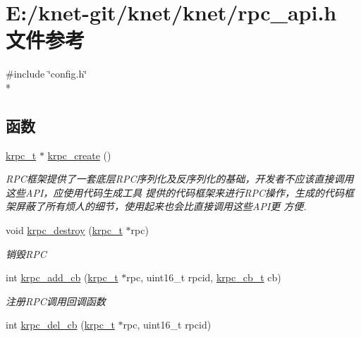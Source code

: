 \hypertarget{a00094}{}\section{E\+:/knet-\/git/knet/knet/rpc\+\_\+api.h 文件参考}
\label{a00094}
{\ttfamily \#include \char`\"{}config.\+h\char`\"{}}\\*
\subsection*{函数}
\begin{DoxyCompactItemize}
\item 
\hyperlink{a00056_a1e414ac6f6de24462ccf81e10f63428d_a1e414ac6f6de24462ccf81e10f63428d}{krpc\+\_\+t} $\ast$ \hyperlink{a00094_a5d55f838d222f44965d99eac9a0381c1_a5d55f838d222f44965d99eac9a0381c1}{krpc\+\_\+create} ()
\begin{DoxyCompactList}\small\item\em R\+P\+C框架提供了一套底层\+R\+P\+C序列化及反序列化的基础，开发者不应该直接调用这些\+A\+P\+I，应使用代码生成工具 提供的代码框架来进行\+R\+P\+C操作，生成的代码框架屏蔽了所有烦人的细节，使用起来也会比直接调用这些\+A\+P\+I更 方便. \end{DoxyCompactList}\item 
void \hyperlink{a00094_ab07c8ccf1abc99b85f455a2f4280ac76_ab07c8ccf1abc99b85f455a2f4280ac76}{krpc\+\_\+destroy} (\hyperlink{a00056_a1e414ac6f6de24462ccf81e10f63428d_a1e414ac6f6de24462ccf81e10f63428d}{krpc\+\_\+t} $\ast$rpc)
\begin{DoxyCompactList}\small\item\em 销毁\+R\+P\+C \end{DoxyCompactList}\item 
int \hyperlink{a00094_aa12a9874d2b0308994c3fa651cdbbd61_aa12a9874d2b0308994c3fa651cdbbd61}{krpc\+\_\+add\+\_\+cb} (\hyperlink{a00056_a1e414ac6f6de24462ccf81e10f63428d_a1e414ac6f6de24462ccf81e10f63428d}{krpc\+\_\+t} $\ast$rpc, uint16\+\_\+t rpcid, \hyperlink{a00056_a06bb708c1b97445d3a5d0c1b32ad2ab6_a06bb708c1b97445d3a5d0c1b32ad2ab6}{krpc\+\_\+cb\+\_\+t} cb)
\begin{DoxyCompactList}\small\item\em 注册\+R\+P\+C调用回调函数 \end{DoxyCompactList}\item 
int \hyperlink{a00094_a76529ccab5c6f0ada79cac791e299ef9_a76529ccab5c6f0ada79cac791e299ef9}{krpc\+\_\+del\+\_\+cb} (\hyperlink{a00056_a1e414ac6f6de24462ccf81e10f63428d_a1e414ac6f6de24462ccf81e10f63428d}{krpc\+\_\+t} $\ast$rpc, uint16\+\_\+t rpcid)

\end{DoxyCompactItemize}
